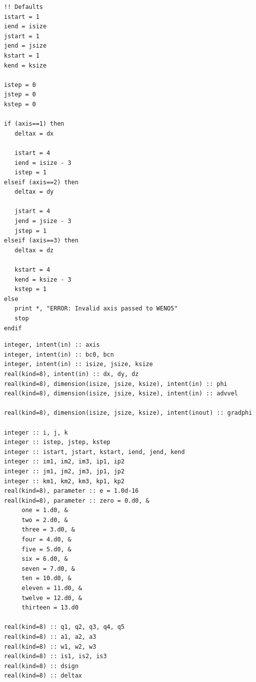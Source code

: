 \documentclass[11pt]{article}
\begin{document}
\begin{lstlisting}
!! Defaults
istart = 1
iend = isize
jstart = 1
jend = jsize
kstart = 1
kend = ksize

istep = 0
jstep = 0
kstep = 0

if (axis==1) then
   deltax = dx

   istart = 4
   iend = isize - 3
   istep = 1
elseif (axis==2) then
   deltax = dy

   jstart = 4
   jend = jsize - 3
   jstep = 1
elseif (axis==3) then
   deltax = dz

   kstart = 4
   kend = ksize - 3
   kstep = 1
else
   print *, "ERROR: Invalid axis passed to WENO5"
   stop
endif
\end{lstlisting}

\begin{lstlisting}
integer, intent(in) :: axis
integer, intent(in) :: bc0, bcn
integer, intent(in) :: isize, jsize, ksize
real(kind=8), intent(in) :: dx, dy, dz
real(kind=8), dimension(isize, jsize, ksize), intent(in) :: phi
real(kind=8), dimension(isize, jsize, ksize), intent(in) :: advvel

real(kind=8), dimension(isize, jsize, ksize), intent(inout) :: gradphi

integer :: i, j, k
integer :: istep, jstep, kstep
integer :: istart, jstart, kstart, iend, jend, kend
integer :: im1, im2, im3, ip1, ip2
integer :: jm1, jm2, jm3, jp1, jp2
integer :: km1, km2, km3, kp1, kp2
real(kind=8), parameter :: e = 1.0d-16
real(kind=8), parameter :: zero = 0.d0, &
     one = 1.d0, &
     two = 2.d0, &
     three = 3.d0, &
     four = 4.d0, &
     five = 5.d0, &
     six = 6.d0, &
     seven = 7.d0, &
     ten = 10.d0, &
     eleven = 11.d0, &
     twelve = 12.d0, &
     thirteen = 13.d0

real(kind=8) :: q1, q2, q3, q4, q5
real(kind=8) :: a1, a2, a3
real(kind=8) :: w1, w2, w3
real(kind=8) :: is1, is2, is3
real(kind=8) :: dsign
real(kind=8) :: deltax
\end{lstlisting}
\end{document}
